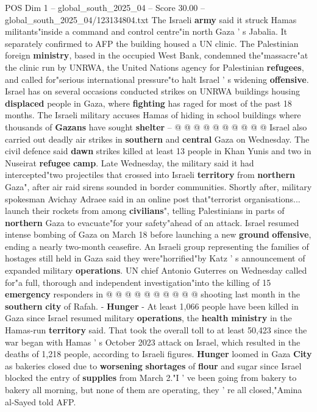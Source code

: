\begin{textsample}{POS Dim 1 – global\_south\_2025\_04 – Score 30.00 – global\_south\_2025\_04/123134804.txt}
The Israeli \textbf{army} said it struck Hamas militants"inside a command and control centre"in north Gaza ' s Jabalia.
It separately confirmed to AFP the building housed a UN clinic.
The Palestinian foreign \textbf{ministry}, based in the occupied West Bank, condemned the"massacre"at the clinic run by UNRWA, the United Nations agency for Palestinian \textbf{refugees}, and called for"serious international pressure"to halt Israel ' s widening \textbf{offensive}.
Israel has on several occasions conducted strikes on UNRWA buildings housing \textbf{displaced} people in Gaza, where \textbf{fighting} has raged for most of the past 18 months.
The Israeli military accuses Hamas of hiding in school buildings where thousands of \textbf{Gazans} have sought \textbf{shelter} -- @ @ @ @ @ @ @ @ @ @ Israel also carried out deadly air strikes in \textbf{southern} and \textbf{central} Gaza on Wednesday.
The civil defence said \textbf{dawn} strikes killed at least 13 people in Khan Yunis and two in Nuseirat \textbf{refugee} \textbf{camp}.
Late Wednesday, the military said it had intercepted"two projectiles that crossed into Israeli \textbf{territory} from \textbf{northern} Gaza", after air raid sirens sounded in border communities.
Shortly after, military spokesman Avichay Adraee said in an online post that"terrorist organisations... launch their rockets from among \textbf{civilians}", telling Palestinians in parts of \textbf{northern} Gaza to evacuate"for your safety"ahead of an attack.
Israel resumed intense bombing of Gaza on March 18 before launching a new \textbf{ground} \textbf{offensive}, ending a nearly two-month ceasefire.
An Israeli group representing the families of hostages still held in Gaza said they were"horrified"by Katz ' s announcement of expanded military \textbf{operations}.
UN chief Antonio Guterres on Wednesday called for"a full, thorough and independent investigation"into the killing of 15 \textbf{emergency} responders in @ @ @ @ @ @ @ @ @ @ shooting last month in the \textbf{southern} \textbf{city} of Rafah. - \textbf{Hunger} - At least 1,066 people have been killed in Gaza since Israel resumed military \textbf{operations}, the \textbf{health} \textbf{ministry} in the Hamas-run \textbf{territory} said.
That took the overall toll to at least 50,423 since the war began with Hamas ' s October 2023 attack on Israel, which resulted in the deaths of 1,218 people, according to Israeli figures. \textbf{Hunger} loomed in Gaza \textbf{City} as bakeries closed due to \textbf{worsening} \textbf{shortages} of \textbf{flour} and sugar since Israel blocked the entry of \textbf{supplies} from March 2."I ' ve been going from bakery to bakery all morning, but none of them are operating, they ' re all closed,"Amina al-Sayed told AFP.

\end{textsample}
